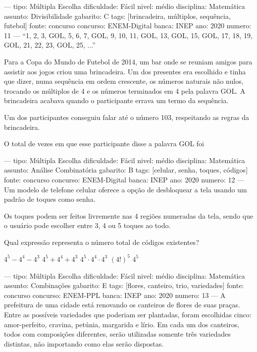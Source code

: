 ---
tipo: Múltipla Escolha
dificuldade: Fácil
nivel: médio
disciplina: Matemática
assunto: Divisibilidade
gabarito: C
tags: [brincadeira, múltiplos, sequência, futebol]
fonte: concurso
concurso: ENEM-Digital
banca: INEP
ano: 2020
numero: 11
---
\question
“1, 2, 3, GOL, 5, 6, 7, GOL, 9, 10, 11, GOL, 13, GOL, 15, GOL, 17, 18, 19, GOL, 21, 22, 23, GOL, 25, ...”

Para a Copa do Mundo de Futebol de 2014, um bar onde se reuniam amigos para assistir aos jogos criou uma brincadeira. Um dos presentes era escolhido e tinha que dizer, numa sequência em ordem crescente, os números naturais não nulos, trocando os múltiplos de 4 e os números terminados em 4 pela palavra GOL. A brincadeira acabava quando o participante errava um termo da sequência.

Um dos participantes conseguiu falar até o número 103, respeitando as regras da brincadeira.

O total de vezes em que esse participante disse a palavra GOL foi
\begin{oneparchoices}
\end{oneparchoices}

---
tipo: Múltipla Escolha
dificuldade: Fácil
nivel: médio
disciplina: Matemática
assunto: Análise Combinatória
gabarito: B
tags: [celular, senha, toques, códigos]
fonte: concurso
concurso: ENEM-Digital
banca: INEP
ano: 2020
numero: 12
---
\question
Um modelo de telefone celular oferece a opção de desbloquear a tela usando um padrão de toques como senha.

Os toques podem ser feitos livremente nas 4 regiões numeradas da tela, sendo que o usuário pode escolher entre 3, 4 ou 5 toques ao todo.

Qual expressão representa o número total de códigos existentes?
\begin{oneparchoices}
\choice \( 4^5 - 4^4 - 4^3 \)
\correctchoice \( 4^5 + 4^4 + 4^3 \)
\choice \( 4^5 \cdot 4^4 \cdot 4^3 \)
\choice \( (4!)^5 \)
\choice \( 4^5 \)
\end{oneparchoices}

---
tipo: Múltipla Escolha
dificuldade: Fácil
nivel: médio
disciplina: Matemática
assunto: Combinações
gabarito: E
tags: [flores, canteiro, trio, variedades]
fonte: concurso
concurso: ENEM-PPL
banca: INEP
ano: 2020
numero: 13
---
\question
A prefeitura de uma cidade está renovando os canteiros de flores de suas praças. Entre as possíveis variedades que poderiam ser plantadas, foram escolhidas cinco: amor-perfeito, cravina, petúnia, margarida e lírio. Em cada um dos canteiros, todos com composições diferentes, serão utilizadas somente três variedades distintas, não importando como elas serão dispostas.

